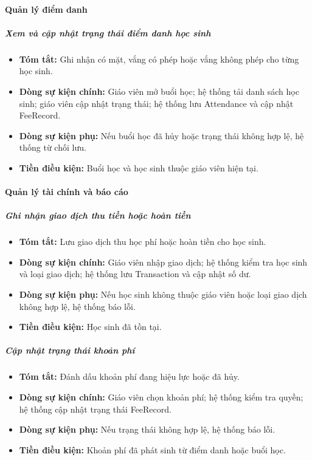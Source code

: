 \documentclass[12pt,a4paper]{article}
\begin{document}
\paragraph{Quản lý điểm danh}

\subparagraph{Xem và cập nhật trạng thái điểm danh học sinh}
\begin{itemize}[leftmargin=*]
\item \textbf{Tóm tắt:} Ghi nhận có mặt, vắng có phép hoặc vắng không phép cho từng học sinh.
\item \textbf{Dòng sự kiện chính:} Giáo viên mở buổi học; hệ thống tải danh sách học sinh; giáo viên cập nhật trạng thái; hệ thống lưu Attendance và cập nhật FeeRecord.
\item \textbf{Dòng sự kiện phụ:} Nếu buổi học đã hủy hoặc trạng thái không hợp lệ, hệ thống từ chối lưu.
\item \textbf{Tiền điều kiện:} Buổi học và học sinh thuộc giáo viên hiện tại.
\end{itemize}

\paragraph{Quản lý tài chính và báo cáo}

\subparagraph{Ghi nhận giao dịch thu tiền hoặc hoàn tiền}
\begin{itemize}[leftmargin=*]
\item \textbf{Tóm tắt:} Lưu giao dịch thu học phí hoặc hoàn tiền cho học sinh.
\item \textbf{Dòng sự kiện chính:} Giáo viên nhập giao dịch; hệ thống kiểm tra học sinh và loại giao dịch; hệ thống lưu Transaction và cập nhật số dư.
\item \textbf{Dòng sự kiện phụ:} Nếu học sinh không thuộc giáo viên hoặc loại giao dịch không hợp lệ, hệ thống báo lỗi.
\item \textbf{Tiền điều kiện:} Học sinh đã tồn tại.
\end{itemize}

\subparagraph{Cập nhật trạng thái khoản phí}
\begin{itemize}[leftmargin=*]
\item \textbf{Tóm tắt:} Đánh dấu khoản phí đang hiệu lực hoặc đã hủy.
\item \textbf{Dòng sự kiện chính:} Giáo viên chọn khoản phí; hệ thống kiểm tra quyền; hệ thống cập nhật trạng thái FeeRecord.
\item \textbf{Dòng sự kiện phụ:} Nếu trạng thái không hợp lệ, hệ thống báo lỗi.
\item \textbf{Tiền điều kiện:} Khoản phí đã phát sinh từ điểm danh hoặc buổi học.
\end{itemize}
\end{document}
